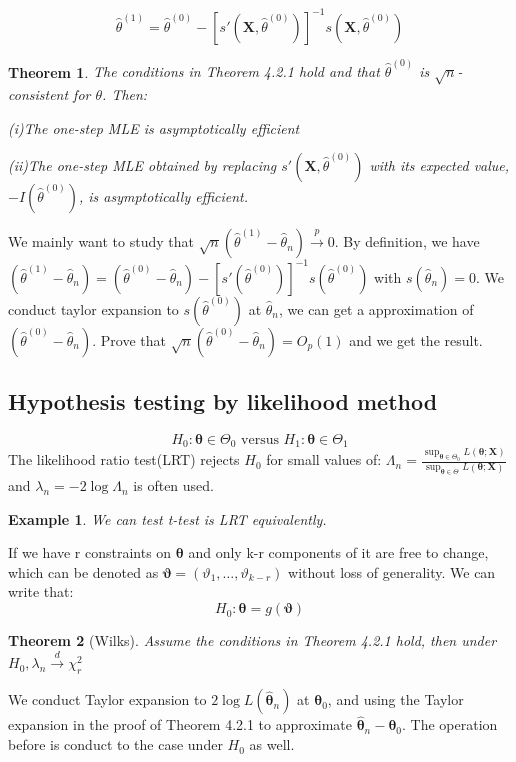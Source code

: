 \documentclass{ctexart}
\newtheorem{theorem}{Theorem}[subsection]
\newtheorem{example}{Example}[subsection]
\begin{document}
\[
\hat{\theta}^{(1)}=\hat{\theta}^{(0)}-[s'(\boldsymbol{X},\hat{\theta}^{(0)})]^{-1}s(\boldsymbol{X},\hat{\theta}^{(0)})
\] 

\begin{theorem}
  The conditions in Theorem 4.2.1 hold and that \(\hat{\theta}^{(0)}\) is \(\sqrt{n}\)-consistent for \(\theta\). Then: 
  
  (i)The one-step MLE is asymptotically efficient

  (ii)The one-step MLE obtained by replacing \(s'(\boldsymbol{X},\hat{\theta}^{(0)})\) with its expected value, \(-I(\hat{\theta}^{(0)})\), is asymptotically efficient.   
\end{theorem}
We mainly want to study that \(\sqrt{n}(\hat{\theta}^{(1)}-\hat{\theta}_{n})\xrightarrow{p}0\). By definition, we have \((\hat{\theta}^{(1)}-\hat{\theta}_{n})=(\hat{\theta}^{(0)}-\hat{\theta}_{n})-[s'(\hat{\theta}^{(0)})]^{-1}s(\hat{\theta}^{(0)})\) with \(s(\hat{\theta}_{n})=0\). 
We conduct taylor expansion to \(s(\hat{\theta}^{(0)})\) at \(\hat{\theta}_{n}\), we can get a approximation of \((\hat{\theta}^{(0)}-\hat{\theta}_{n})\). Prove that \(\sqrt{n}(\hat{\theta}^{(0)}-\hat{\theta}_{n})=O_{p}(1)\) and we get the result.

\subsection{Hypothesis testing by likelihood method}
\[
H_{0}:\boldsymbol{\theta}\in \Theta_{0}\text{ versus }H_{1}: \boldsymbol{\theta}\in \Theta_{1}
\] 
The likelihood ratio test(LRT) rejects \(H_{0}\) for small values of: \(\Lambda_{n}=\frac{\sup _{\boldsymbol{\theta}\in \Theta_{0}}L(\boldsymbol{\theta};\boldsymbol{X})}{\sup _{\boldsymbol{\theta}\in \Theta_{}}L(\boldsymbol{\theta};\boldsymbol{X})}\)  
and \(\lambda_{n}=-2\log \Lambda_{n}\) is often used.                 
\begin{example}
  We can test t-test is LRT equivalently. 
\end{example} 
If we have r constraints on \(\boldsymbol{\theta}\) and only k-r components of it are free to change, which can be denoted as \(\boldsymbol{\vartheta}=(\vartheta_{1},\ldots,\vartheta_{k-r})\) without loss of generality. We can write that:
\[
H_{0}: \boldsymbol{\theta}=g(\boldsymbol{\vartheta})
\]   
\begin{theorem}[Wilks]
  Assume the conditions in Theorem 4.2.1 hold, then under \(H_{0},\lambda_{n}\xrightarrow{d}\chi_{r}^{2}\)  
\end{theorem}
We conduct Taylor expansion to \(2\log L(\hat{\boldsymbol{\theta}}_{n})\) at \(\boldsymbol{\theta}_{0}\), and using the Taylor expansion in the proof of Theorem 4.2.1 to approximate \(\hat{\boldsymbol{\theta}}_{n}-\boldsymbol{\theta}_{0}\). The operation before is conduct to the case under \(H_{0}\) as well.  
\end{document}
